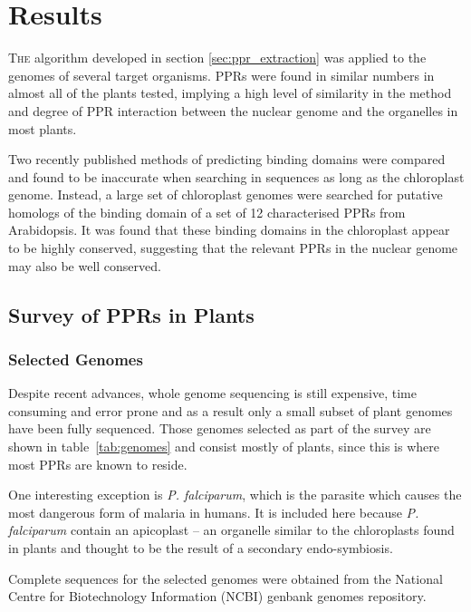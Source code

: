 
\chapter{Results} 
\label{chap:results}

\lettrine{T}{he} 
algorithm developed in section \ref{sec:ppr_extraction} was applied to the
genomes of several target organisms.
PPRs were found in similar numbers in almost all of the plants tested, implying
a high level of similarity in the method and degree of PPR interaction between
the nuclear genome and the organelles in most plants.

Two recently published methods of predicting binding domains were compared and
found to be inaccurate when searching in sequences as long as the chloroplast
genome.
Instead, a large set of chloroplast genomes were searched
for putative homologs of the binding domain of a set of 12 characterised PPRs 
from Arabidopsis.
It was found that these binding domains in the chloroplast appear to be highly 
conserved, suggesting that the relevant PPRs in the nuclear genome may also be
well conserved.

\section{Survey of PPRs in Plants}
\label{sec:ppr_survey}

\subsection{Selected Genomes}
\label{sec:survey_genomes}

Despite recent advances, whole genome sequencing is still expensive,
time consuming and error prone and as a result only a small subset of plant
genomes have been fully sequenced.
Those genomes selected as part of the survey are shown in 
table~\ref{tab:genomes} and
consist mostly of plants, since this is where most PPRs are known to reside.

One interesting exception is \emph{P. falciparum}, which is the parasite which
causes the most dangerous form of malaria in humans.
It is included here because \emph{P. falciparum} contain an apicoplast -- 
an organelle similar to the chloroplasts found in plants and thought to be the 
result of a secondary endo-symbiosis. 

Complete sequences for the selected genomes were obtained from the National
Centre for Biotechnology Information (NCBI) genbank genomes repository.


